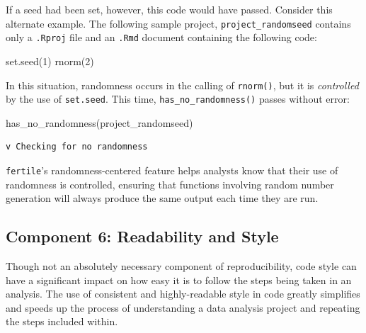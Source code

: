 \documentclass[12pt,twoside]{reedthesis}
\newenvironment{Shaded}{\begin{snugshade}}{\end{snugshade}}
\newcommand{\DecValTok}[1]{\textcolor[rgb]{0.00,0.00,0.81}{#1}}
\newcommand{\FunctionTok}[1]{\textcolor[rgb]{0.00,0.00,0.00}{#1}}
\newcommand{\NormalTok}[1]{#1}
\newcommand{\StringTok}[1]{\textcolor[rgb]{0.31,0.60,0.02}{#1}}
\begin{document}
If a seed had been set, however, this code would have passed. Consider this alternate example. The following sample project, \texttt{project\_randomseed} contains only a \texttt{.Rproj} file and an \texttt{.Rmd} document containing the following code:
\begin{Shaded}
\begin{Highlighting}[]
\FunctionTok{set.seed}\NormalTok{(}\DecValTok{1}\NormalTok{)}
\FunctionTok{rnorm}\NormalTok{(}\DecValTok{2}\NormalTok{)}
\end{Highlighting}
\end{Shaded}
In this situation, randomness occurs in the calling of \texttt{rnorm()}, but it is \emph{controlled} by the use of \texttt{set.seed}. This time, \texttt{has\_no\_randomness()} passes without error:
\begin{Shaded}
\begin{Highlighting}[]
\FunctionTok{has\_no\_randomness}\NormalTok{(}\StringTok{\textquotesingle{}project\_randomseed\textquotesingle{}}\NormalTok{)}
\end{Highlighting}
\end{Shaded}
\begin{verbatim}
v Checking for no randomness
\end{verbatim}
\texttt{fertile}'s randomness-centered feature helps analysts know that their use of randomness is controlled, ensuring that functions involving random number generation will always produce the same output each time they are run.

\hypertarget{component-6-readability-and-style}{%
\subsection{Component 6: Readability and Style}\label{component-6-readability-and-style}}

Though not an absolutely necessary component of reproducibility, code style can have a significant impact on how easy it is to follow the steps being taken in an analysis. The use of consistent and highly-readable style in code greatly simplifies and speeds up the process of understanding a data analysis project and repeating the steps included within.
\end{document}
